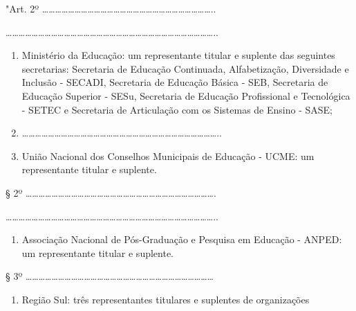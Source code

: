 \documentclass[
]{book}
\providecommand{\tightlist}{%
  \setlength{\itemsep}{0pt}\setlength{\parskip}{0pt}}
\begin{document}
"Art. 2º \ldots\ldots\ldots\ldots\ldots\ldots\ldots\ldots\ldots\ldots\ldots\ldots\ldots\ldots\ldots\ldots\ldots\ldots\ldots\ldots\ldots\ldots\ldots\ldots\ldots\ldots..

\ldots\ldots\ldots\ldots\ldots\ldots\ldots\ldots\ldots\ldots\ldots\ldots\ldots\ldots\ldots\ldots\ldots\ldots\ldots\ldots\ldots\ldots\ldots\ldots\ldots\ldots\ldots\ldots\ldots\ldots\ldots\ldots..

\begin{enumerate}
\def\labelenumi{\alph{enumi})}
\item
  Ministério da Educação: um representante titular e suplente das seguintes secretarias: Secretaria de Educação Continuada, Alfabetização, Diversidade e Inclusão - SECADI, Secretaria de Educação Básica - SEB, Secretaria de Educação Superior - SESu, Secretaria de Educação Profissional e Tecnológica - SETEC e Secretaria de Articulação com os Sistemas de Ensino - SASE;
\item
  \ldots\ldots\ldots\ldots\ldots\ldots\ldots\ldots\ldots\ldots\ldots\ldots\ldots\ldots\ldots\ldots\ldots\ldots\ldots\ldots\ldots\ldots\ldots\ldots\ldots\ldots\ldots\ldots\ldots\ldots..
\item
  União Nacional dos Conselhos Municipais de Educação - UCME: um representante titular e suplente.
\end{enumerate}

§ 2º \ldots\ldots\ldots\ldots\ldots\ldots\ldots\ldots\ldots\ldots\ldots\ldots\ldots\ldots\ldots\ldots\ldots\ldots\ldots\ldots\ldots\ldots\ldots\ldots\ldots\ldots\ldots\ldots\ldots.

\ldots\ldots\ldots\ldots\ldots\ldots\ldots\ldots\ldots\ldots\ldots\ldots\ldots\ldots\ldots\ldots\ldots\ldots\ldots\ldots\ldots\ldots\ldots\ldots\ldots\ldots\ldots\ldots\ldots\ldots\ldots\ldots..

\begin{enumerate}
\def\labelenumi{\alph{enumi})}
\setcounter{enumi}{4}
\tightlist
\item
  Associação Nacional de Pós-Graduação e Pesquisa em Educação - ANPED: um representante titular e suplente.
\end{enumerate}

§ 3º \ldots\ldots\ldots\ldots\ldots\ldots\ldots\ldots\ldots\ldots\ldots\ldots\ldots\ldots\ldots\ldots\ldots\ldots\ldots\ldots\ldots\ldots\ldots\ldots\ldots\ldots\ldots\ldots\ldots{}

\begin{enumerate}
\def\labelenumi{\alph{enumi})}
\setcounter{enumi}{3}
\tightlist
\item
  Região Sul: três representantes titulares e suplentes de organizações
\end{enumerate}
\end{document}
